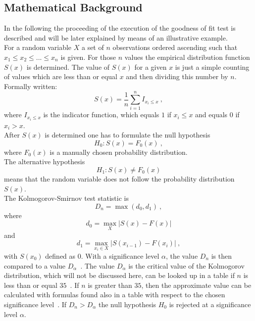 \documentclass{article}
\theoremstyle{definition}
\begin{document}
\subsection{Mathematical Background}
In the following the proceeding of the execution of the goodness of fit test is described and will be later explained by means of an illustrative example. \\
For a random variable $X$ a set of $n$ observations ordered ascending such that $x_1 \le x_2 \le ... \le x_n$ is given. For those $n$ values the empirical distribution function $S(x)$  is determined.
The value of $S(x)$ for a given $x$ is just a simple counting of values which are less than or equal $x$ and then dividing this number by $n$. Formally written: 
$$S(x) = \frac{1}{n} \sum\limits^n_{i=1} I_{x_i\le x}~,$$
where $I_{x_i\le x}$ is the indicator function, which equals $1$ if $x_i\le x$ and equals $0$ if $x_i>x$.\\
After $S(x)$  is determined one has to formulate the null hypothesis 
$$H_0:S (x)=F_0 (x)~,$$ 
where $F_0 (x)$ is a manually chosen probability distribution.\\
The alternative hypothesis 
$$H_1:S (x)\ne F_0 (x)$$ 
means that the random variable does not follow the probability distribution $S(x)$.\\
The Kolmogorov-Smirnov test statistic is
$$D_n = \max (d_0,d_1)~,$$
where 
$$d_0=\max_{X} |S(x)-F(x)|$$ 
and
$$d_1 = \max_{x_i \in X} | S(x_{i-1})-F(x_i)|~,$$
with $S (x_0)$  defined as $0$. With a significance level $\alpha$, the value $D_n$ is then compared to a value $D_\alpha$~\cite{nagcKS}.
The value $D_\alpha$ is the critical value of the Kolmogorov distribution, which will not be discussed here, can be looked up in a table if $n$ is less than or equal $35$~\cite{massey1951}. If $n$ is greater than $35$, then the approximate value can be calculated with formulas found also in a table with respect to the chosen significance level~\cite{massey1951}. If $D_n>D_\alpha$ the null hypothesis $H_0$  is rejected at a significance level $\alpha$.

\end{document}
